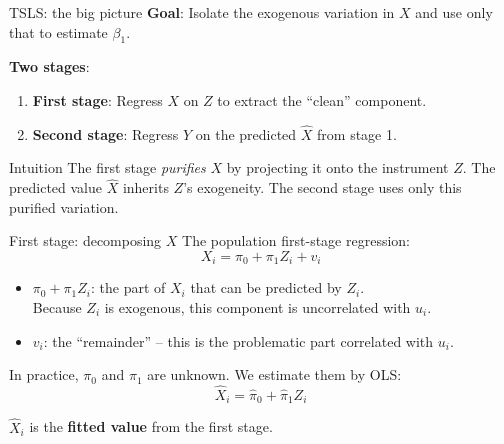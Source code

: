 \documentclass[10pt]{beamer}
\begin{document}
\begin{frame}{TSLS: the big picture}
\label{slide:tsls_overview}
\textbf{Goal}: Isolate the exogenous variation in $X$ and use only that to estimate $\beta_1$.

\vspace{0.5em}
\textbf{Two stages}:
\begin{enumerate}
  \item \textbf{First stage}: Regress $X$ on $Z$ to extract the ``clean'' component.
  \item \textbf{Second stage}: Regress $Y$ on the predicted $\widehat{X}$ from stage 1.
\end{enumerate}

\pause
\vspace{0.5em}
\begin{exampleblock}{Intuition}
The first stage \emph{purifies} $X$ by projecting it onto the instrument $Z$. The predicted value $\widehat{X}$ inherits $Z$'s exogeneity.  The second stage uses only this purified variation.
\end{exampleblock}
\end{frame}

\begin{frame}{First stage: decomposing $X$}
\label{slide:first_stage}
The population first-stage regression:
\begin{equation}
X_i = \pi_0 + \pi_1 Z_i + v_i \tag{12.2}
\end{equation}

\begin{itemize}
  \item $\pi_0 + \pi_1 Z_i$: the part of $X_i$ that can be predicted by $Z_i$.\\
        Because $Z_i$ is exogenous, this component is \alert{uncorrelated with $u_i$}.
  \item $v_i$: the ``remainder'' -- this is the \alert{problematic} part correlated with $u_i$.
\end{itemize}

\pause
\vspace{0.5em}
In practice, $\pi_0$ and $\pi_1$ are unknown. We estimate them by OLS:
\[
\widehat{X}_i = \widehat{\pi}_0 + \widehat{\pi}_1 Z_i
\]

$\widehat{X}_i$ is the \textbf{fitted value} from the first stage.
\end{frame}
\end{document}
